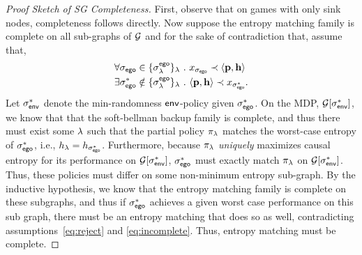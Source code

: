 \begin{proof}[Proof Sketch of SG Completeness]
  First, observe that on games with only sink nodes, completeness
  follows directly. Now suppose the entropy matching family is
  complete on all sub-graphs of $\mathcal{G}$ and for the sake of
  contradiction that, assume that,
  \begin{align}
    &\forall \sched_\pOne \in \{\sched^{\pOne}_\rat\}_\rat~.~ x_{\sched_{\pOne}} \prec \langle \scthreshold, \randomness \rangle\label{eq:reject}\\
    &\exists \sched_\pOne^* \notin \{\sched^{\pOne}_\rat\}_\rat~.~  \langle \scthreshold, \randomness \rangle \prec x_{\sched_{\pOne}^*}\label{eq:incomplete}.
  \end{align}
  Let $\sigma_{\mathsf{env}}^*$ denote the min-randomness $\mathsf{env}$-policy given
  $\sigma_{\mathsf{ego}}^*$. On the MDP, $\mathcal{G}[\sigma_{\mathsf{env}}^*]$, we know that
  that the soft-bellman backup family is complete, and thus there must
  exist some $\lambda$ such that the partial policy $\pi_\lambda$ matches
  the worst-case entropy of $\sigma_{\mathsf{ego}}^*$, i.e.,
  $h_\lambda = h_{\sigma_{\mathsf{ego}}^*}$. Furthermore, because
  $\pi_\lambda$ \emph{uniquely} maximizes causal entropy for its
  performance on $\mathcal{G}[\sigma_{\mathsf{env}}^*]$, $\sigma_{\mathsf{ego}}^*$ must exactly
  match $\pi_\lambda$ on $\mathcal{G}[\sigma_{\mathsf{env}}^*]$. Thus, these policies must
  differ on some non-minimum entropy sub-graph. By the inductive
  hypothesis, we know that the entropy matching family is complete on
  these subgraphs, and thus if $\sigma_{\mathsf{ego}}^*$ achieves a given worst
  case performance on this sub graph, there must be an entropy
  matching that does so as well, contradicting
  assumptions~\eqref{eq:reject} and \eqref{eq:incomplete}.  Thus,
  entropy matching must be complete.
\end{proof}

